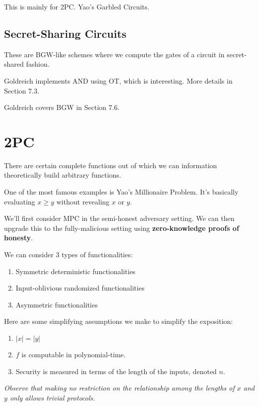 \documentclass{article}
\theoremstyle{definition}
\begin{document}
This is mainly for 2PC. Yao's Garbled Circuits.

\subsection{Secret-Sharing Circuits}

These are BGW-like schemes where we compute the gates of a circuit in secret-shared fashion.

Goldreich implements AND using OT, which is interesting. More details in Section 7.3.

Goldreich covers BGW in Section 7.6.


\newpage

\section{2PC}

There are certain complete functions out of which we can information theoretically build arbitrary functions.

One of the most famous examples is Yao's Millionaire Problem. It's basically evaluating $x \geq y$ without revealing $x$ or $y$.

We'll first consider MPC in the semi-honest adversary setting. We can then upgrade this to the fully-malicious setting using \textbf{zero-knowledge proofs of honesty}.

We can consider 3 types of functionalities:

\begin{enumerate}
    \item Symmetric deterministic functionalities
    \item Input-oblivious randomized functionalities
    \item Asymmetric functionalities
\end{enumerate}

Here are some simplifying assumptions we make to simplify the exposition:

\begin{enumerate}
    \item $\lvert x \rvert = \lvert y \rvert$
    \item $f$ is computable in polynomial-time.
    \item Security is measured in terms of the length of the inputs, denoted $n$.
\end{enumerate}

\textit{Observe that making no restriction on the relationship among the lengths of $x$ and $y$ only allows trivial
protocols.}
\end{document}
